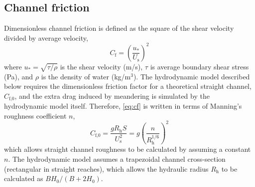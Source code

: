 \documentclass[preprint, review, authoryear, 12pt]{elsarticle}
\begin{document}
\subsection{Channel friction}

Dimensionless channel friction is defined as the square of the shear velocity divided by average velocity,
\begin{equation}\label{eq:cf}
C_\text{f} = \left(\frac{u_*}{U_\text{s}}\right)^2
\end{equation}
where $u_*=\sqrt{\tau / \rho}$ is the shear velocity (m/s), $\tau$ is average boundary shear stress (Pa), and $\rho$ is the density of water (kg/m$^3$). The hydrodynamic model described below requires the dimensionless friction factor for a theoretical straight channel, $C_\text{f,0}$, and the extra drag induced by meandering is simulated by the hydrodynamic model itself. Therefore, \cref{eq:cf} is written in terms of Manning's roughness coefficient $n$,
\begin{equation}\label{eq:cf0}
C_\text{f,0} = \frac{\displaystyle g R_\text{h} S}{\displaystyle U_\text{s}^2} = g\left(\frac{\displaystyle n}{\displaystyle R_\text{h}^{1/6}}\right)^2
\end{equation}
which allows straight channel roughness to be calculated by assuming a constant $n$. The hydrodynamic model assumes a trapezoidal channel cross-section (rectangular in straight reaches), which allows the hydraulic radius $R_\text{h}$ to be calculated as $BH_0/(B+2H_0)$.
\end{document}
